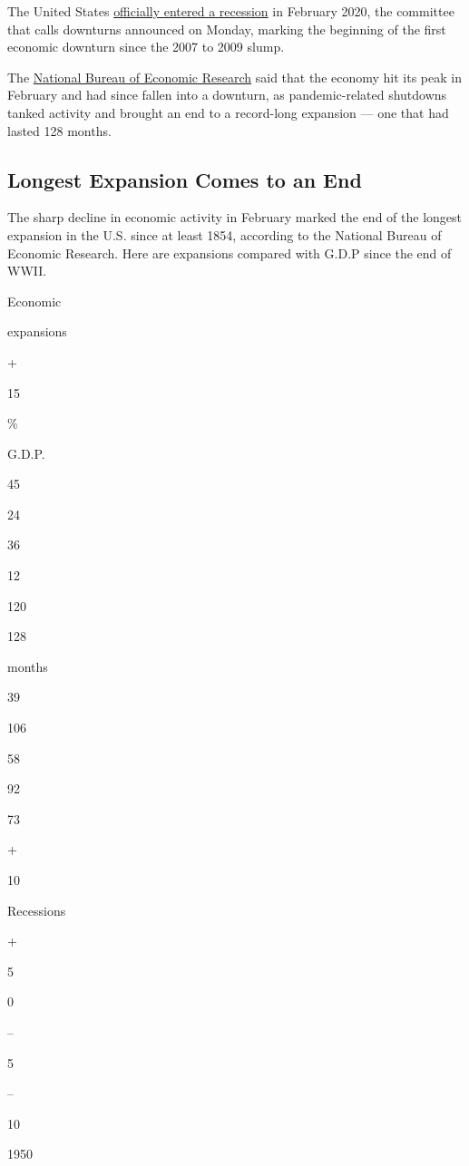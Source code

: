 The United States
\href{https://www.nytimes3xbfgragh.onion/2020/06/08/business/economy/us-economy-recession-2020.html}{officially
entered a recession} in February 2020, the committee that calls
downturns announced on Monday, marking the beginning of the first
economic downturn since the 2007 to 2009 slump.

The \href{https://www.nber.org/cycles.html}{National Bureau of Economic
Research} said that the economy hit its peak in February and had since
fallen into a downturn, as pandemic-related shutdowns tanked activity
and brought an end to a record-long expansion --- one that had lasted
128 months.

\hypertarget{longest-expansion-comes-to-an-end}{%
\subsection{Longest Expansion Comes to an
End}\label{longest-expansion-comes-to-an-end}}

The sharp decline in economic activity in February marked the end of the
longest expansion in the U.S. since at least 1854, according to the
National Bureau of Economic Research. Here are expansions compared with
G.D.P since the end of WWII.

Economic

expansions

+

15

\%

G.D.P.

45

24

36

12

120

128

months

39

106

58

92

73

+

10

Recessions

+

5

0

--

5

--

10

1950

